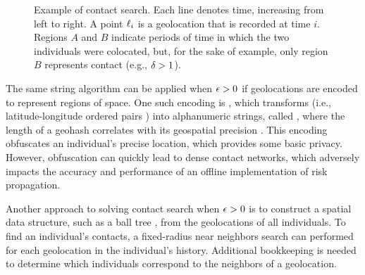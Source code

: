 \begin{figure}[htbp]
\centering
{}
\caption[Example of contact search]{Example of contact search. Each line denotes time, increasing from left to right. A point $\ell_i$ is a geolocation that is recorded at time $i$. Regions $A$ and $B$ indicate periods of time in which the two individuals were colocated, but, for the sake of example, only region $B$ represents contact (e.g., $\delta > 1$).}
\label{fig:contact-search}
\end{figure}

The same string algorithm can be applied when $\epsilon > 0$ if geolocations are encoded to represent regions of space. One such encoding is , which transforms  (i.e., latitude-longitude ordered pairs \citep[p. 5]{Sickle2004}) into alphanumeric strings, called , where the length of a geohash correlates with its geospatial precision \citep{Morton1966}. This encoding obfuscates an individual's precise location, which provides some basic privacy. However, obfuscation can quickly lead to dense contact networks, which adversely impacts the accuracy and performance of an offline implementation of risk propagation.

Another approach to solving contact search when $\epsilon > 0$ is to construct a spatial data structure, such as a ball tree \citep{Omohundro1989, Neeraj2008, Kibriya2007}, from the geolocations of all individuals. To find an individual's contacts, a fixed-radius near neighbors search \citep{Bentley1975,Brin1995} can performed for each geolocation in the individual's history. Additional bookkeeping is needed to determine which individuals correspond to the neighbors of a geolocation. 

